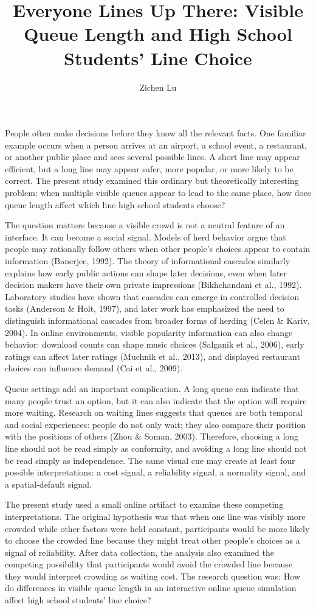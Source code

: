 \documentclass[stu,12pt,floatsintext]{apa7}
\title{Everyone Lines Up There: Visible Queue Length and High School Students' Line Choice}
\author{Zichen Lu}
\affiliation{[TODO: School]}
\begin{document}
\maketitle

People often make decisions before they know all the relevant facts. One familiar example occurs when a person arrives at an airport, a school event, a restaurant, or another public place and sees several possible lines. A short line may appear efficient, but a long line may appear safer, more popular, or more likely to be correct. The present study examined this ordinary but theoretically interesting problem: when multiple visible queues appear to lead to the same place, how does queue length affect which line high school students choose?

The question matters because a visible crowd is not a neutral feature of an interface. It can become a social signal. Models of herd behavior argue that people may rationally follow others when other people's choices appear to contain information (Banerjee, 1992). The theory of informational cascades similarly explains how early public actions can shape later decisions, even when later decision makers have their own private impressions (Bikhchandani et al., 1992). Laboratory studies have shown that cascades can emerge in controlled decision tasks (Anderson \& Holt, 1997), and later work has emphasized the need to distinguish informational cascades from broader forms of herding (Celen \& Kariv, 2004). In online environments, visible popularity information can also change behavior: download counts can shape music choices (Salganik et al., 2006), early ratings can affect later ratings (Muchnik et al., 2013), and displayed restaurant choices can influence demand (Cai et al., 2009).

Queue settings add an important complication. A long queue can indicate that many people trust an option, but it can also indicate that the option will require more waiting. Research on waiting lines suggests that queues are both temporal and social experiences: people do not only wait; they also compare their position with the positions of others (Zhou \& Soman, 2003). Therefore, choosing a long line should not be read simply as conformity, and avoiding a long line should not be read simply as independence. The same visual cue may create at least four possible interpretations: a cost signal, a reliability signal, a normality signal, and a spatial-default signal.

The present study used a small online artifact to examine these competing interpretations. The original hypothesis was that when one line was visibly more crowded while other factors were held constant, participants would be more likely to choose the crowded line because they might treat other people's choices as a signal of reliability. After data collection, the analysis also examined the competing possibility that participants would avoid the crowded line because they would interpret crowding as waiting cost. The research question was: How do differences in visible queue length in an interactive online queue simulation affect high school students' line choice?
\end{document}
